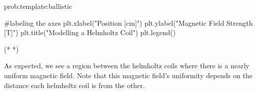 \begin{solution}{prob:template:ballistic}
\begin{python}[caption=Numerical integration of a function]
	
	#labeling the axes
	plt.xlabel("Position [cm]")
	plt.ylabel("Magnetic Field Strength [T]")
	plt.title("Modelling a Helmholtz Coil")
	plt.legend()
	
\end{python}
\begin{poutput}
	(*  *)
\end{poutput}
	As expected, we see a region between the helmholtz coils where there is a nearly uniform magnetic field. Note that this magnetic field's uniformity depends on the distance each helmholtz coil is from the other.
\end{solution}
